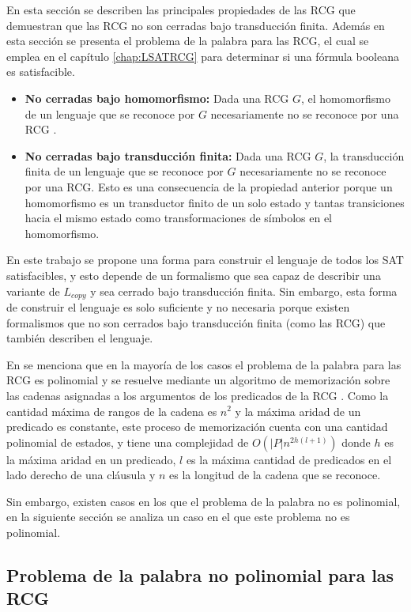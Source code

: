 \documentclass[12pt]{article}
\begin{document}
En esta sección se describen las principales propiedades de las RCG que demuestran que las RCG no son cerradas 
bajo transducción finita. Además en esta sección se presenta el problema de la palabra 
para las RCG, el cual se emplea en el capítulo \ref{chap:LSATRCG} para determinar si una fórmula booleana es satisfacible.

\begin{itemize}
    \item  \textbf{No cerradas bajo homomorfismo:} Dada una RCG $G$, el homomorfismo de un lenguaje que se reconoce por $G$ necesariamente no se reconoce por una RCG \cite{propertiesRCGBib}.
    \item \textbf{No cerradas bajo transducción finita:} Dada una RCG $G$, la transducción finita de un lenguaje que se reconoce por $G$ necesariamente no se reconoce por una RCG. Esto es una consecuencia de la propiedad anterior porque un homomorfismo es un transductor finito de un solo estado y tantas transiciones hacia el mismo estado como transformaciones de símbolos en el homomorfismo.
\end{itemize}

En este trabajo se propone una forma para construir el lenguaje de todos los SAT satisfacibles, y esto depende de un formalismo que 
sea capaz de describir una variante de $L_{copy}$ y sea cerrado bajo transducción finita. Sin embargo, esta forma de construir el lenguaje es solo suficiente 
y no necesaria porque existen formalismos que no son cerrados bajo transducción finita (como las RCG) que también 
describen el lenguaje.

En \cite{mainRCGBib} se menciona que en la mayoría de los casos el problema de la palabra para las RCG es polinomial y se resuelve mediante un algoritmo de memorización sobre las cadenas asignadas a los argumentos de los predicados de la RCG \cite{mainRCGBib}.  Como la cantidad máxima de rangos de la cadena es $n^2$ y la máxima aridad de un predicado es constante, este proceso de memorización cuenta con una cantidad polinomial de estados, y tiene una complejidad de $O(|P|n^{2h(l+1)})$ donde $h$ es la máxima aridad en un predicado, $l$ es la máxima cantidad de predicados en el lado derecho de una cláusula y $n$ es la longitud de la cadena que se reconoce.

Sin embargo, existen casos en los que el problema de la palabra no es polinomial, en la siguiente sección se analiza un caso en el que este problema no es polinomial.

\subsection{Problema de la palabra no polinomial para las RCG}
\end{document}
